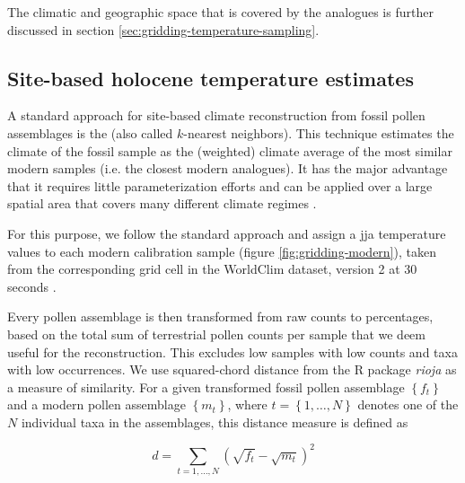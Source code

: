 \begin{refsection}
The climatic and geographic space that is covered by the analogues is further discussed in section \ref{sec:gridding-temperature-sampling}.

\subsection{Site-based holocene temperature estimates}  \label{sec:gridding-mat}
A standard approach for site-based climate reconstruction from fossil pollen assemblages is the  (also called $k$-nearest neighbors). This technique estimates the climate of the fossil sample as the (weighted) climate average of the most similar modern samples (i.e. the closest modern analogues). It has the major advantage that it requires little parameterization efforts and can be applied over a large spatial area that covers many different climate regimes \citep{MauriDavisCollinsEtAl2015}. 

For this purpose, we follow the standard approach and assign a \gls{jja} temperature values to each modern calibration sample (figure \ref{fig:gridding-modern}), taken from the corresponding grid cell in the WorldClim dataset, version 2 at 30 seconds \citep{FickHijmans2017}.

Every pollen assemblage is then transformed from raw counts to percentages, based on the total sum of terrestrial pollen counts per sample that we deem useful for the reconstruction. This excludes low samples with low counts and taxa with low occurrences. We use squared-chord distance from the R package \textit{rioja} \citep{Juggins2017} as a measure of similarity. For a given transformed fossil pollen assemblage $\left\lbrace f_{t}\right\rbrace$ and a modern pollen assemblage $\left\lbrace m_{t}\right\rbrace$, where $t=\left\lbrace1,\ldots,N\right\rbrace$ denotes one of the $N$ individual taxa in the assemblages, this distance measure is defined as

\begin{equation*}
d = \sum_{t=1,\ldots,N}\left(\sqrt{f_{t}} - \sqrt{m_{t}}\right)^2
\end{equation*}


\end{refsection}
